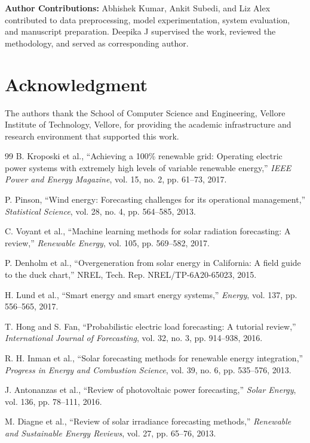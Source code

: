 \documentclass{ieeeaccess}
\begin{document}
\textbf{Author Contributions:} Abhishek Kumar, Ankit Subedi, and Liz Alex contributed to data preprocessing, model experimentation, system evaluation, and manuscript preparation. Deepika J supervised the work, reviewed the methodology, and served as corresponding author.

\section*{Acknowledgment}
The authors thank the School of Computer Science and Engineering, Vellore Institute of Technology, Vellore, for providing the academic infrastructure and research environment that supported this work.


\begin{thebibliography}{99}
B. Kroposki et al., ``Achieving a 100\% renewable grid: Operating electric power systems with extremely high levels of variable renewable energy,'' \emph{IEEE Power and Energy Magazine}, vol. 15, no. 2, pp. 61--73, 2017.

P. Pinson, ``Wind energy: Forecasting challenges for its operational management,'' \emph{Statistical Science}, vol. 28, no. 4, pp. 564--585, 2013.

C. Voyant et al., ``Machine learning methods for solar radiation forecasting: A review,'' \emph{Renewable Energy}, vol. 105, pp. 569--582, 2017.

P. Denholm et al., ``Overgeneration from solar energy in California: A field guide to the duck chart,'' NREL, Tech. Rep. NREL/TP-6A20-65023, 2015.

H. Lund et al., ``Smart energy and smart energy systems,'' \emph{Energy}, vol. 137, pp. 556--565, 2017.

T. Hong and S. Fan, ``Probabilistic electric load forecasting: A tutorial review,'' \emph{International Journal of Forecasting}, vol. 32, no. 3, pp. 914--938, 2016.

R. H. Inman et al., ``Solar forecasting methods for renewable energy integration,'' \emph{Progress in Energy and Combustion Science}, vol. 39, no. 6, pp. 535--576, 2013.

J. Antonanzas et al., ``Review of photovoltaic power forecasting,'' \emph{Solar Energy}, vol. 136, pp. 78--111, 2016.

M. Diagne et al., ``Review of solar irradiance forecasting methods,'' \emph{Renewable and Sustainable Energy Reviews}, vol. 27, pp. 65--76, 2013.


\end{thebibliography}
\end{document}
